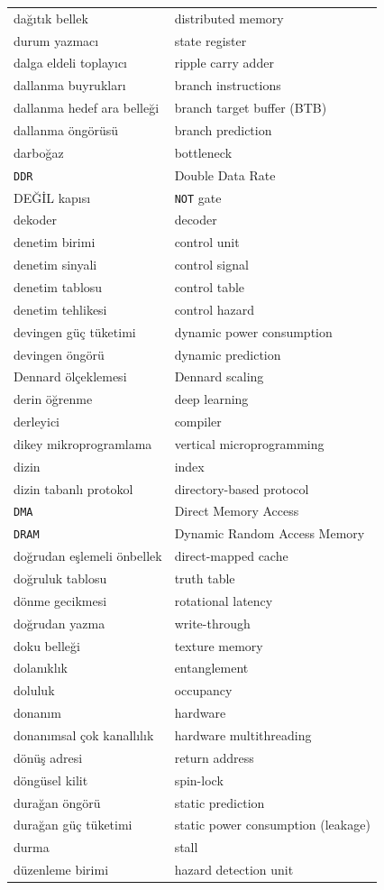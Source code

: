 {\begin{longtable}{@{}p{7.6cm}p{7.6cm}@{}}
dağıtık bellek & distributed memory \\
durum yazmacı & state register \\
dalga eldeli toplayıcı & ripple carry adder \\
dallanma buyrukları & branch instructions \\
dallanma hedef ara belleği & branch target buffer (BTB) \\
dallanma öngörüsü & branch prediction \\
darboğaz & bottleneck \\
\texttt{DDR} & Double Data Rate \\
DEĞİL kapısı & \texttt{NOT} gate \\
dekoder & decoder \\
denetim birimi & control unit \\
denetim sinyali & control signal \\
denetim tablosu & control table \\
denetim tehlikesi & control hazard \\
devingen güç tüketimi & dynamic power consumption \\
devingen öngörü & dynamic prediction \\
Dennard ölçeklemesi & Dennard scaling \\
derin öğrenme & deep learning \\
derleyici & compiler \\
dikey mikroprogramlama & vertical microprogramming \\
dizin & index \\
dizin tabanlı protokol & directory-based protocol \\
\texttt{DMA} & Direct Memory Access \\
\texttt{DRAM} & Dynamic Random Access Memory \\
doğrudan eşlemeli önbellek & direct-mapped cache \\
doğruluk tablosu & truth table \\
dönme gecikmesi & rotational latency \\
doğrudan yazma & write-through \\
doku belleği & texture memory \\
dolanıklık & entanglement \\
doluluk & occupancy \\
donanım & hardware \\
donanımsal çok kanallılık & hardware multithreading \\
dönüş adresi & return address \\
döngüsel kilit & spin-lock \\
durağan öngörü & static prediction \\
durağan güç tüketimi & static power consumption (leakage) \\
durma & stall \\
düzenleme birimi & hazard detection unit \\


\end{longtable}}
